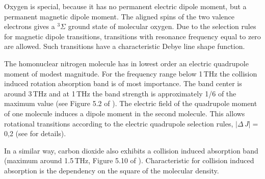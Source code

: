 Oxygen is special, because it has no permanent electric dipole moment,
but a permanent magnetic dipole moment. The aligned spins of the two
valence electrons gives a $^{3}\Sigma$ ground state of molecular
oxygen.  Due to the selection rules for magnetic dipole transitions,
transitions with resonance frequency equal to zero are allowed. Such
transitions have a characteristic Debye line shape function.

The homonuclear nitrogen molecule has in lowest order an electric quadrupole moment 
of modest magnitude.
For the frequency range below 1\,THz the collision induced rotation absorption 
band \citep{goodyandyung:89} is of most importance. The band center is around 3\,THz and 
at 1\,THz the band strength is approximately 1/6 of the maximum value (see 
Figure 5.2 of \citet{goodyandyung:89}). The electric field of the quadrupole 
moment of one molecule induces a dipole moment in the second molecule. This allows 
rotational transitions according to the electric quadrupole selection rules, 
$|\Delta\,J|=$0,2 (see \citet{pwr:93} for details). 

In a similar way, carbon dioxide also exhibits a collision induced
absorption band (maximum around 1.5\,THz, Figure 5.10 of
\citet{goodyandyung:89}). Characteristic for collision induced
absorption is the dependency on the square of the molecular density.



